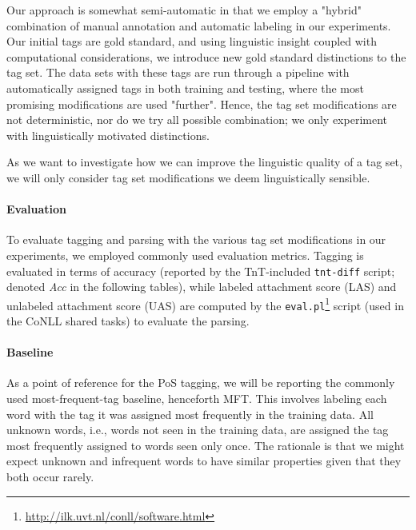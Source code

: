 \documentclass[11pt,a4paper]{article}
\begin{document}
Our approach is somewhat semi-automatic in that we employ a "hybrid"
combination of manual annotation and automatic labeling in our experiments. Our
initial tags are gold standard, and using linguistic insight coupled with
computational considerations, we introduce new gold standard distinctions to
the tag set. The data sets with these tags are run through a pipeline with
automatically assigned tags in both training and testing, where the most
promising modifications are used "further". Hence, the tag set modifications
are not deterministic, nor do we try all possible combination; we only
experiment with linguistically motivated distinctions.

As we want to investigate how we can improve the linguistic quality of a tag
set, we will only consider tag set modifications we deem linguistically
sensible.


\paragraph{Evaluation}
To evaluate tagging and parsing with the various tag set modifications in our
experiments, we employed commonly used evaluation metrics. Tagging is evaluated
in terms of accuracy (reported by the TnT-included \texttt{tnt-diff} script;
denoted \emph{Acc} in the following tables), while labeled attachment score
(LAS) and unlabeled attachment score (UAS) are computed by the
\texttt{eval.pl}\footnote{\url{http://ilk.uvt.nl/conll/software.html}} script
(used in the CoNLL shared tasks) to evaluate the parsing.

\paragraph{Baseline}
As a point of reference for the PoS tagging, we will be reporting the commonly
used most-frequent-tag baseline, henceforth MFT. This involves labeling each
word with the tag it was assigned most frequently in the training data. All
unknown words, i.e., words not seen in the training data, are assigned the tag
most frequently assigned to words seen only once. The rationale is that we
might expect unknown and infrequent words to have similar properties given that
they both occur rarely.
\end{document}
